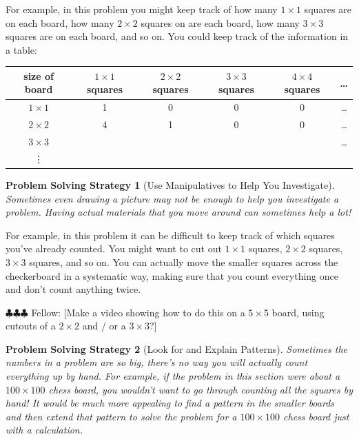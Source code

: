 \documentclass[10pt, reqno]{amsart}
\newtheorem{ps}{Problem Solving Strategy}
\theoremstyle{remark}
\theoremstyle{definition}
\numberwithin{equation}{section}  %
\newcommand{\fellow}[1]{{\color{magenta} \sf $\clubsuit\clubsuit\clubsuit$ Fellow: [#1]}}
\begin{document}
 For example, in this problem you might keep track of how many $1\times 1$ squares are on each board, how many $2\times2$ squares on are each board, how many $3 \times 3$ squares are on each board, and so on.  You could keep track of the information in a table:
 
 \begin{tabular}{ |c| | c| c| c| c| c|  }\hline
 size of board &  $1 \times 1 $ squares &  $2 \times 2 $ squares &  $3 \times 3 $ squares &  $4 \times 4 $ squares & \dots \\\hline\hline
 $1 \times 1 $ & 1 & 0 & 0 & 0 & \dots\\
 \hline
 $2 \times 2 $ & 4 & 1 & 0 & 0 & \dots\\
 \hline
  $3 \times 3 $ &   &   &   &   & \dots\\
  \hline
  \vdots &  & & & & \\
  \hline
\end{tabular}


\begin{ps}[Use Manipulatives to Help You Investigate]
Sometimes even drawing a picture may not be enough to help you investigate a problem.  Having actual materials that you move around can sometimes help a lot!
\end{ps}

For example, in this problem it can be difficult to keep track of which squares you've already counted.  You might want to cut out $1 \times 1$ squares, $2 \times 2$ squares, $3 \times 3$ squares, and so on.  You can actually move the smaller squares across the checkerboard in a systematic way, making sure that you count everything once and don't count anything twice.

\fellow{Make a video showing how to do this on a $5 \times 5$ board, using cutouts of a $2 \times 2$ and / or a $3 \times 3$?}


\begin{ps}[Look for and Explain Patterns]
Sometimes the numbers in a problem are so big, there's no way you will actually count everything up by hand.  For example, if the problem in this section were about a $100 \times 100$ chess board, you wouldn't want to go through counting all the squares by hand!  It would be much more appealing to find a pattern in the smaller boards and then extend that pattern to solve the problem for a $100 \times 100$ chess board just with a calculation.
\end{ps}
\end{document}
